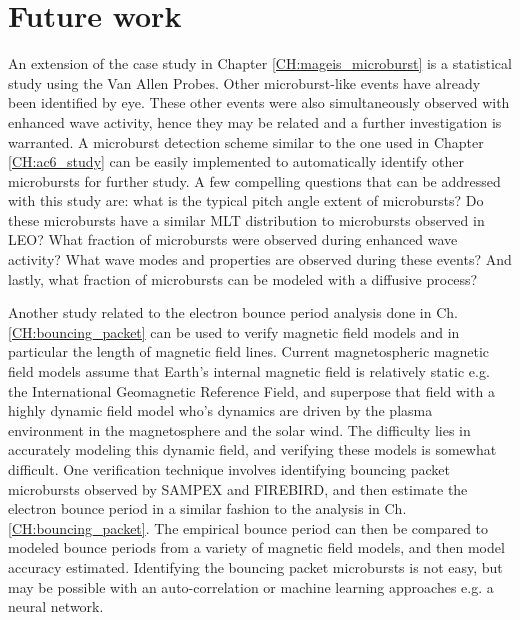 \section{Future work}
An extension of the case study in Chapter \ref{CH:mageis_microburst} is a statistical study using the Van Allen Probes. Other microburst-like events have already been identified by eye. These other events were also simultaneously observed with enhanced wave activity, hence they may be related and a further investigation is warranted. A microburst detection scheme similar to the one used in Chapter \ref{CH:ac6_study} can be easily implemented to automatically identify other microbursts for further study. A few compelling questions that can be addressed with this study are: what is the typical pitch angle extent of microbursts? Do these microbursts have a similar MLT distribution to microbursts observed in LEO? What fraction of microbursts were observed during enhanced wave activity? What wave modes and properties are observed during these events? And lastly, what fraction of microbursts can be modeled with a diffusive process?

Another study related to the electron bounce period analysis done in Ch. \ref{CH:bouncing_packet} can be used to verify magnetic field models and in particular the length of magnetic field lines. Current magnetospheric magnetic field models assume that Earth's internal magnetic field is relatively static e.g. the International Geomagnetic Reference Field, and superpose that field with a highly dynamic field model who's dynamics are driven by the plasma environment in the magnetosphere and the solar wind. The difficulty lies in accurately modeling this dynamic field, and verifying these models is somewhat difficult. One verification technique involves identifying bouncing packet microbursts observed by SAMPEX and FIREBIRD, and then estimate the electron bounce period in a similar fashion to the analysis in  Ch. \ref{CH:bouncing_packet}. The empirical bounce period can then be compared to modeled bounce periods from a variety of magnetic field models, and then model accuracy estimated. Identifying the bouncing packet microbursts is not easy, but may be possible with an auto-correlation or machine learning approaches e.g. a neural network.

